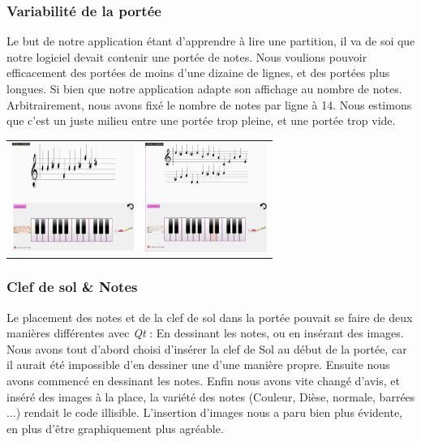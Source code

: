 \documentclass{article}
\begin{document}
\subsubsection{Variabilité de la portée}
Le but de notre application étant d'apprendre à lire une partition, il va de soi que notre logiciel devait contenir une portée de notes. 
Nous voulions pouvoir efficacement des portées de moins d'une dizaine de lignes, et des portées plus longues. Si bien que notre application adapte son affichage au nombre de notes. Arbitrairement, nous avons fixé le nombre de notes par ligne à 14. Nous estimons que c'est un juste milieu entre une portée trop pleine, et une portée trop vide.
\begin{center}
\begin{tabular}{cc}

	\includegraphics[width = 150px]{./images/1Line.png}

	&

	\includegraphics[width = 150px]{./images/2Line.png}

	\\
\end{tabular}
\end{center}

\subsubsection{Clef de sol \& Notes}
Le placement des notes et de la clef de sol dans la portée pouvait se faire de deux manières différentes avec \emph{Qt} : En dessinant les notes, ou en insérant des images. Nous avons tout d'abord choisi d'insérer la clef de Sol au début de la portée, car il aurait été impossible d'en dessiner une d'une manière propre. Ensuite nous avons commencé en dessinant les notes. Enfin nous avons vite changé d'avis, et inséré des images à la place, la variété des notes (Couleur, Dièse, normale, barrées ...) rendait le code illisible. L'insertion d'images nous a paru bien plus évidente, en plus d'être graphiquement plus agréable. 
\end{document}
